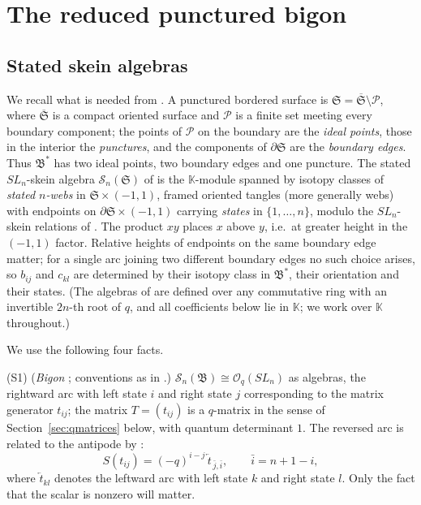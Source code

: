 \documentclass[12pt]{article}
\theoremstyle{remark}
\newcommand{\kk}{\mathbb K}
\newcommand{\Skein}{\mathcal S_n}
\newcommand{\Bstar}{\mathfrak B^*}
\newcommand{\Bigon}{\mathfrak B}
\newcommand{\Oq}{\mathcal O_q(SL_n)}
\begin{document}
\section{The reduced punctured bigon}\label{sec:skein}

\subsection{Stated skein algebras}\label{sec:statedskein}

We recall what is needed from \cite{LS,LY}. A punctured bordered
surface is $\mathfrak S=\overline{\mathfrak S}\setminus\mathcal P$,
where $\overline{\mathfrak S}$ is a compact oriented surface and
$\mathcal P$ is a finite set meeting every boundary component; the
points of $\mathcal P$ on the boundary are the \emph{ideal points},
those in the interior the \emph{punctures}, and the components of
$\partial\mathfrak S$ are the \emph{boundary edges}. Thus $\Bstar$ has
two ideal points, two boundary edges and one puncture. The stated $SL_n$-skein
algebra $\Skein(\mathfrak S)$ of \cite{LS} is the $\kk$-module spanned
by isotopy classes of \emph{stated $n$-webs} in
$\mathfrak S\times(-1,1)$, framed oriented tangles (more generally
webs) with endpoints on $\partial\mathfrak S\times(-1,1)$ carrying
\emph{states} in $\{1,\dots,n\}$, modulo the $SL_n$-skein relations of
\cite{LS}. The product $xy$ places $x$ above $y$, i.e.\ at
greater height in the $(-1,1)$ factor. Relative heights of endpoints on
the same boundary edge matter; for a single arc joining two different
boundary edges no such choice arises, so $b_{ij}$ and $c_{kl}$ are
determined by their isotopy class in $\Bstar$, their orientation and
their states. (The algebras of \cite{LS} are defined over any
commutative ring with an invertible $2n$-th root of $q$, and all
coefficients below lie in $\kk$; we work over $\kk$ throughout.)

We use the following four facts.

\noindent(S1) (\emph{Bigon} \cite[Theorem 6.3]{LS}; conventions as in
\cite[Sections 3.1 and 4.7]{LY}.) $\Skein(\Bigon)\cong\Oq$ as algebras,
the rightward arc with left state $i$ and right state $j$ corresponding
to the matrix generator $t_{ij}$; the matrix $T=(t_{ij})$ is a
$q$-matrix in the sense of Section~\ref{sec:qmatrices} below, with
quantum determinant $1$. The reversed arc is related to the antipode
by \cite[equation (83)]{LY}:
\begin{equation}\label{eq:antipode}
 S(t_{ij})=(-q)^{i-j}\,\overleftarrow{t}_{\,\bar j,\bar i},
 \qquad\bar i=n+1-i,
\end{equation}
where $\overleftarrow t_{kl}$ denotes the leftward arc with left state
$k$ and right state $l$. Only the fact that the scalar is nonzero will
matter.
\end{document}
